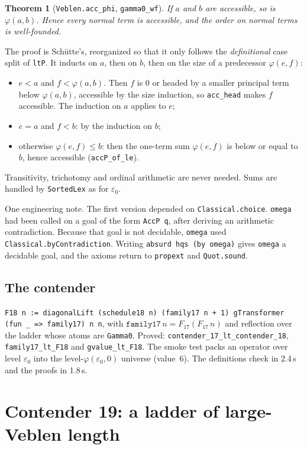 \documentclass[11pt]{article}
\newtheorem{theorem}{Theorem}
\theoremstyle{definition}
\theoremstyle{remark}
\newcommand{\lean}[1]{\texttt{#1}}
\begin{document}
\begin{theorem}[\lean{Veblen.acc\_phi}, \lean{gamma0\_wf}]
If $a$ and $b$ are accessible, so is $\varphi(a,b)$. Hence every normal term
is accessible, and the order on normal terms is well-founded.
\end{theorem}
The proof is Schütte's, reorganized so that it only follows the
\emph{definitional} case split of \lean{ltP}. It inducts on $a$, then on $b$,
then on the size of a predecessor $\varphi(e,f)$:
\begin{itemize}
\item $e<a$ and $f<\varphi(a,b)$. Then $f$ is $0$ or headed by a smaller
  principal term below $\varphi(a,b)$, accessible by the size induction, so
  \lean{acc\_head} makes $f$ accessible. The induction on $a$ applies to $e$;
\item $e=a$ and $f<b$: by the induction on $b$;
\item otherwise $\varphi(e,f)\le b$: then the one-term sum $\varphi(e,f)$ is
  below or equal to $b$, hence accessible (\lean{accP\_of\_le}).
\end{itemize}
Transitivity, trichotomy and ordinal arithmetic are never needed. Sums are
handled by \lean{SortedLex} as for $\varepsilon_0$.

One engineering note. The first version depended on
\lean{Classical.choice}. \lean{omega} had been called on a goal of the form
\lean{AccP q}, after deriving an arithmetic contradiction. Because that goal is not decidable, \lean{omega}
used \lean{Classical.byContradiction}. Writing \lean{absurd hqs (by omega)}
gives \lean{omega} a decidable goal, and the axioms return to \lean{propext} and
\lean{Quot.sound}.

\subsection{The contender}
\lean{F18 n := diagonalLift (schedule18 n) (family17 n + 1) gTransformer (fun \_ => family17) n n},
with $\mathtt{family17}\,n = F_{17}(F_{17}\,n)$ and reflection over the ladder
whose atoms are \lean{Gamma0}. Proved:
\lean{contender\_17\_lt\_\allowbreak contender\_18}, \lean{family17\_lt\_F18} and
\lean{gvalue\_lt\_F18}. The smoke test packs an operator over level
$\varepsilon_0$ into the level-$\varphi(\varepsilon_0,0)$ universe (value~6).
The definitions check in 2.4\,s and the proofs in 1.8\,s.

\section{Contender 19: a ladder of large-Veblen length}
\end{document}
